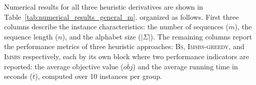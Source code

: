 \documentclass[runningheads]{llncs}
\begin{document}
   
     Numerical results for all three heuristic derivatives are shown in Table~\ref{tab:numerical_results_general_m}.   organized as follows. 
     First three columns describe the instance characteristics: the number of sequences ($m$), the sequence length ($n$), and the alphabet size ($|\Sigma|$).  The remaining columns report the performance metrics of three heuristic approaches: \textsc{Bs}, \textsc{Imsbs-greedy}, and \textsc{Imsbs} respectively, each by its own block where two performance indicators are reported: the average objective value ($\overline{obj}$) and the average running time in seconds ($\overline{t}$), computed over 10 instances per group. 
   
\begin{table}[!ht]
	\caption{Numerical results   on the \textsc{Random} benchmark suite. }\label{tab:numerical_results_general_m}
	\centering
\end{table}
\end{document}
